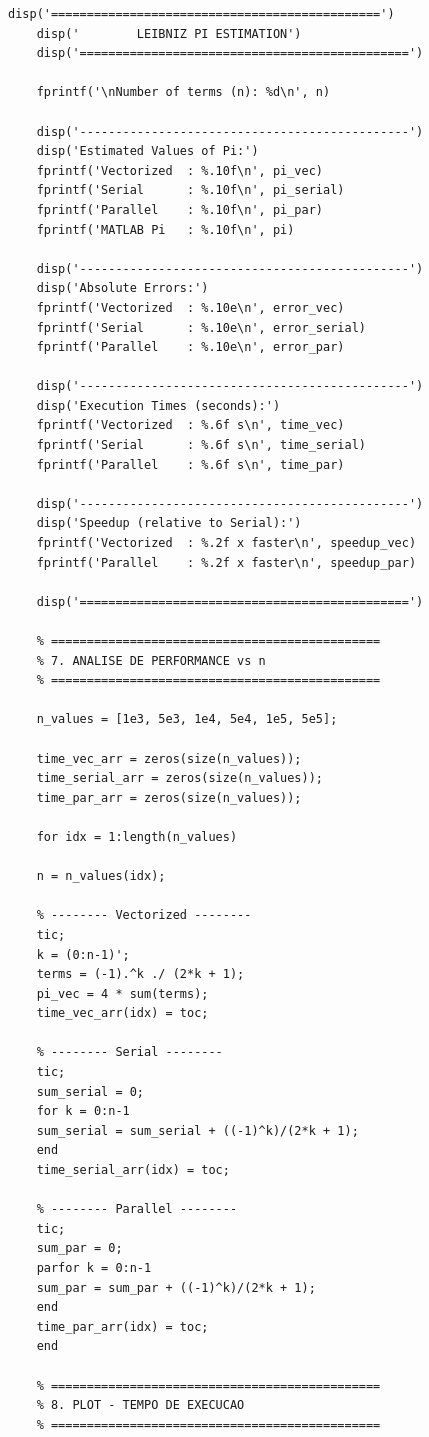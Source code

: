 \documentclass[12pt, a4paper]{article}
\begin{document}
\begin{lstlisting}[style=matlab, caption={pratica02.m}, label={lst:matlab}]
	disp('==============================================')
	disp('        LEIBNIZ PI ESTIMATION')
	disp('==============================================')
	
	fprintf('\nNumber of terms (n): %d\n', n)
	
	disp('----------------------------------------------')
	disp('Estimated Values of Pi:')
	fprintf('Vectorized  : %.10f\n', pi_vec)
	fprintf('Serial      : %.10f\n', pi_serial)
	fprintf('Parallel    : %.10f\n', pi_par)
	fprintf('MATLAB Pi   : %.10f\n', pi)
	
	disp('----------------------------------------------')
	disp('Absolute Errors:')
	fprintf('Vectorized  : %.10e\n', error_vec)
	fprintf('Serial      : %.10e\n', error_serial)
	fprintf('Parallel    : %.10e\n', error_par)
	
	disp('----------------------------------------------')
	disp('Execution Times (seconds):')
	fprintf('Vectorized  : %.6f s\n', time_vec)
	fprintf('Serial      : %.6f s\n', time_serial)
	fprintf('Parallel    : %.6f s\n', time_par)
	
	disp('----------------------------------------------')
	disp('Speedup (relative to Serial):')
	fprintf('Vectorized  : %.2f x faster\n', speedup_vec)
	fprintf('Parallel    : %.2f x faster\n', speedup_par)
	
	disp('==============================================')
	
	% ==============================================
	% 7. ANALISE DE PERFORMANCE vs n
	% ==============================================
	
	n_values = [1e3, 5e3, 1e4, 5e4, 1e5, 5e5];
	
	time_vec_arr = zeros(size(n_values));
	time_serial_arr = zeros(size(n_values));
	time_par_arr = zeros(size(n_values));
	
	for idx = 1:length(n_values)
	
	n = n_values(idx);
	
	% -------- Vectorized --------
	tic;
	k = (0:n-1)';
	terms = (-1).^k ./ (2*k + 1);
	pi_vec = 4 * sum(terms);
	time_vec_arr(idx) = toc;
	
	% -------- Serial --------
	tic;
	sum_serial = 0;
	for k = 0:n-1
	sum_serial = sum_serial + ((-1)^k)/(2*k + 1);
	end
	time_serial_arr(idx) = toc;
	
	% -------- Parallel --------
	tic;
	sum_par = 0;
	parfor k = 0:n-1
	sum_par = sum_par + ((-1)^k)/(2*k + 1);
	end
	time_par_arr(idx) = toc;
	end
	
	% ==============================================
	% 8. PLOT - TEMPO DE EXECUCAO
	% ==============================================
	

\end{lstlisting}
\end{document}
